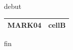 \documentclass[11pt,a4paper]{article}
\begin{document}
debut

\begin{table}[h]
\begin{tabular}{|l|l|}
\hline
MARK04 & cellB \\ \hline
\end{tabular}
\end{table}

fin
\end{document}
